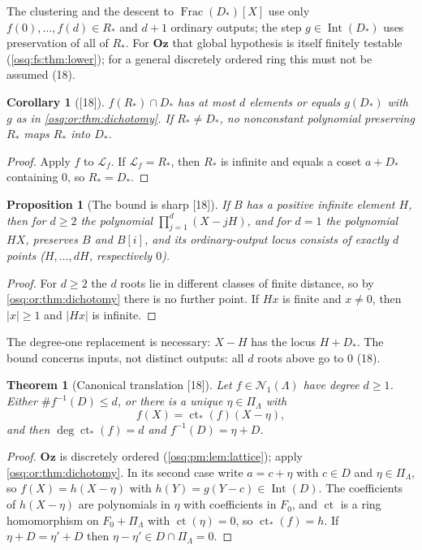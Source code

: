 \documentclass[11pt,letterpaper]{article}
\numberwithin{equation}{section}
\newtheorem{theorem}{Theorem}[section]
\newtheorem{proposition}[proposition]{Proposition}
\newtheorem{corollary}[corollary]{Corollary}
\theoremstyle{definition}
\theoremstyle{remark}
\theoremstyle{plain}
\newcommand{\Oz}{\mathbf{Oz}}
\newcommand{\ct}{\operatorname{ct}}
\newcommand{\Frac}{\operatorname{Frac}}
\newcommand{\Int}{\operatorname{Int}}
\newcommand{\Num}{\mathscr N}
\newcommand{\src}[1]{\textup{\textsf{[#1]}}}
\begin{document}
The clustering and the descent to $\Frac(D_*)[X]$ use only $f(0),\dots,f(d)\in R_*$ and $d+1$ ordinary outputs; the step $g\in\Int(D_*)$ uses
preservation of all of $R_*$. For $\Oz$ that global hypothesis is itself finitely testable (\cref{osq:fs:thm:lower}); for a general discretely ordered
ring this must not be assumed (18).

\begin{corollary}[\src{18}]\label{osq:or:cor:trace}
$f(R_*)\cap D_*$ has at most $d$ elements or equals $g(D_*)$ with $g$ as in \cref{osq:or:thm:dichotomy}. If $R_*\ne D_*$, no nonconstant polynomial
preserving $R_*$ maps $R_*$ into $D_*$.
\end{corollary}
\begin{proof}
Apply $f$ to $\mathcal L_f$. If $\mathcal L_f=R_*$, then $R_*$ is infinite and equals a coset $a+D_*$ containing $0$, so $R_*=D_*$.
\end{proof}

\begin{proposition}[The bound is sharp \src{18}]\label{osq:or:prop:sharp}
If $B$ has a positive infinite element $H$, then for $d\ge2$ the polynomial $\prod_{j=1}^d(X-jH)$, and for $d=1$ the polynomial $HX$, preserves $B$ and
$B[i]$, and its ordinary-output locus consists of exactly $d$ points ($H,\dots,dH$, respectively $0$).
\end{proposition}
\begin{proof}
For $d\ge2$ the $d$ roots lie in different classes of finite distance, so by \cref{osq:or:thm:dichotomy} there is no further point. If $Hx$ is finite and
$x\ne0$, then $|x|\ge1$ and $|Hx|$ is infinite.
\end{proof}

The degree-one replacement is necessary: $X-H$ has the locus $H+D_*$. The bound concerns inputs, not distinct outputs: all $d$ roots above go to $0$
(18).

\begin{theorem}[Canonical translation \src{18}]\label{osq:or:thm:canonical}
Let $f\in\Num_1(\Lambda)$ have degree $d\ge1$. Either $\#f^{-1}(D)\le d$, or there is a unique $\eta\in\Pi_\Lambda$ with
\[
 f(X)=\ct_*(f)(X-\eta),
\]
and then $\deg\ct_*(f)=d$ and $f^{-1}(D)=\eta+D$.
\end{theorem}
\begin{proof}
$\Oz$ is discretely ordered (\cref{osq:pm:lem:lattice}); apply \cref{osq:or:thm:dichotomy}. In its second case write $a=c+\eta$ with $c\in D$ and
$\eta\in\Pi_\Lambda$, so $f(X)=h(X-\eta)$ with $h(Y)=g(Y-c)\in\Int(D)$. The coefficients of $h(X-\eta)$ are polynomials in $\eta$ with coefficients
in $F_0$, and $\ct$ is a ring homomorphism on $F_0+\Pi_\Lambda$ with $\ct(\eta)=0$, so $\ct_*(f)=h$. If $\eta+D=\eta'+D$ then $\eta-\eta'\in D\cap\Pi_\Lambda=0$.
\end{proof}
\end{document}
